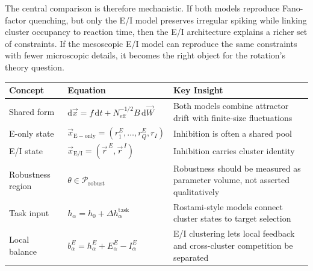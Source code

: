 The central comparison is therefore mechanistic. If both models reproduce Fano-factor quenching, but only the E/I model preserves irregular spiking while linking cluster occupancy to reaction time, then the E/I architecture explains a richer set of constraints. If the mesoscopic E/I model can reproduce the same constraints with fewer microscopic details, it becomes the right object for the rotation's theory question.

\begin{chaptersummary}

\begin{center}
\renewcommand{\arraystretch}{1.45}
\begin{tabularx}{\textwidth}{@{}l X X@{}}
  \toprule
  \textbf{Concept} & \textbf{Equation} & \textbf{Key Insight} \\
  \midrule
  Shared form &
  $\mathrm{d}\vec x=f\,\mathrm{d}t+N_{\mathrm{eff}}^{-1/2}B\,\mathrm{d}\vec W$ &
  Both models combine attractor drift with finite-size fluctuations \\
  E-only state &
  $\vec x_{\mathrm{E-only}}=(r_1^E,\ldots,r_Q^E,r_I)$ &
  Inhibition is often a shared pool \\
  E/I state &
  $\vec x_{\mathrm{E/I}}=(\vec r^{\,E},\vec r^{\,I})$ &
  Inhibition carries cluster identity \\
  Robustness region &
  $\theta\in\mathcal{P}_{\mathrm{robust}}$ &
  Robustness should be measured as parameter volume, not asserted qualitatively \\
  Task input &
  $h_{\alpha}=h_0+\Delta h_{\alpha}^{\mathrm{task}}$ &
  Rostami-style models connect cluster states to target selection \\
  Local balance &
  $b_{\alpha}^{E}=h_{\alpha}^{E}+E_{\alpha}^{E}-I_{\alpha}^{E}$ &
  E/I clustering lets local feedback and cross-cluster competition be separated \\
  \bottomrule
\end{tabularx}
\end{center}

\end{chaptersummary}

